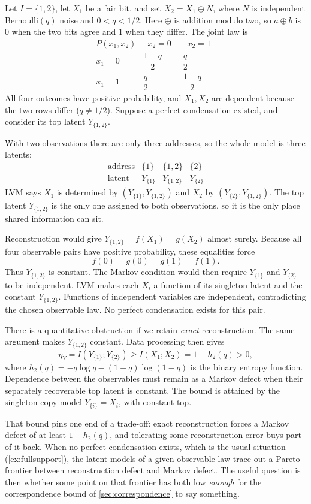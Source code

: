 \documentclass[11pt]{article}
\begin{document}
Let $I=\{1,2\}$, let $X_1$ be a fair bit, and set $X_2=X_1\mathbin{\oplus}N$,
where $N$ is independent Bernoulli$(q)$ noise and $0<q<1/2$. Here
$\oplus$ is addition modulo two, so $a\oplus b$ is $0$ when the two bits agree
and $1$ when they differ.
The joint law is
\[
\renewcommand{\arraystretch}{1.8}
\begin{array}{r|cc}
 P(x_1,x_2) & \;\;x_2=0\;\; & \;\;x_2=1\;\;\\\hline
 x_1=0 & \dfrac{1-q}{2} & \dfrac{q}{2}\\
 x_1=1 & \dfrac{q}{2} & \dfrac{1-q}{2}
\end{array}
\]
All four outcomes have positive probability, and $X_1,X_2$ are dependent
because the two rows differ ($q\ne1/2$).
Suppose a perfect condensation existed, and consider its top latent
$Y_{\{1,2\}}$.

With two observations there are only three addresses, so the whole model is
three latents:
\[
\begin{array}{r|ccc}
 \text{address} & \{1\} & \{1,2\} & \{2\}\\
 \text{latent} & Y_{\{1\}} & Y_{\{1,2\}} & Y_{\{2\}}
\end{array}
\]
LVM says $X_1$ is determined by $(Y_{\{1\}},Y_{\{1,2\}})$ and $X_2$ by
$(Y_{\{2\}},Y_{\{1,2\}})$. The top latent $Y_{\{1,2\}}$ is the only one assigned to both
observations, so it is the only place shared information can sit.

Reconstruction would give $Y_{\{1,2\}}=f(X_1)=g(X_2)$ almost surely. Because
all four observable pairs have positive probability, these equalities force
\[
 f(0)=g(0)=g(1)=f(1).
\]
Thus $Y_{\{1,2\}}$ is constant. The Markov condition would then require
$Y_{\{1\}}$ and $Y_{\{2\}}$ to be independent. LVM
makes each $X_i$ a function of its singleton latent and the constant $Y_{\{1,2\}}$.
Functions of independent variables are independent, contradicting the chosen
observable law. No perfect condensation exists for this pair.

There is a quantitative obstruction if we retain \emph{exact} reconstruction. The same argument makes $Y_{\{1,2\}}$ constant. Data processing then
gives
\[
 \eta_Y=I(Y_{\{1\}};Y_{\{2\}})
 \ge I(X_1;X_2)=1-h_2(q)>0,
\]
where $h_2(q)=-q\log q-(1-q)\log(1-q)$ is the binary entropy function.
Dependence between the observables must remain as a Markov defect when their
separately recoverable top latent is constant. The bound is attained by the
singleton-copy model $Y_{\{i\}}=X_i$, with constant top.

That bound pins one end of a trade-off: exact reconstruction forces a Markov
defect of at least $1-h_2(q)$, and tolerating some reconstruction error buys
part of it back. When no perfect condensation exists, which is the usual
situation (\cref{ex:fullsupport}), the latent models of a given observable law trace out a Pareto
frontier between reconstruction defect and Markov defect. The useful question
is then whether some point on that frontier has both low \emph{enough} for the
correspondence bound of \cref{sec:correspondence} to say something.
\end{document}
